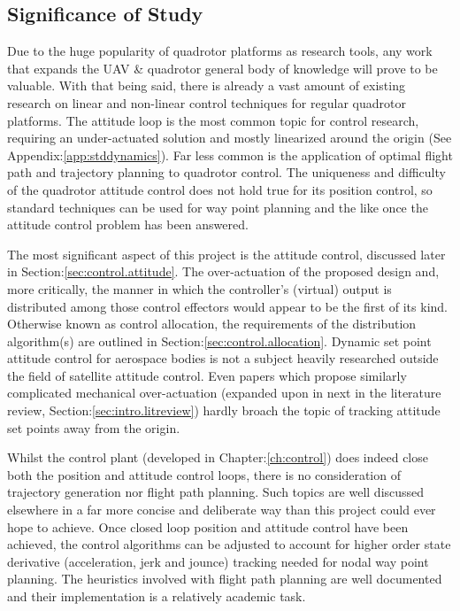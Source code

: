 \subsection{Significance of Study}
\label{subsec:intro.foreword.significance}
Due to the huge popularity of quadrotor platforms as research tools, any work that expands the UAV \& quadrotor general body of knowledge will prove to be valuable. With that being said, there is already a vast amount of existing research on linear and non-linear control techniques for regular quadrotor platforms. The attitude loop is the most common topic for control research, requiring an under-actuated solution and mostly linearized around the origin (See Appendix:\ref{app:stddynamics}). Far less common is the application of optimal flight path and trajectory planning to quadrotor control. The uniqueness and difficulty of the quadrotor attitude control does not hold true for its position control, so standard techniques can be used for way point planning and the like once the attitude control problem has been answered.
\par
The most significant aspect of this project is the attitude control, discussed later in Section:\ref{sec:control.attitude}. The over-actuation of the proposed design and, more critically, the manner in which the controller's (virtual) output is distributed among those control effectors would appear to be the first of its kind. Otherwise known as control allocation, the requirements of the distribution algorithm(s) are outlined in Section:\ref{sec:control.allocation}. Dynamic set point attitude control for aerospace bodies is not a subject heavily researched outside the field of satellite attitude control. Even papers which propose similarly complicated mechanical over-actuation (expanded upon in next in the literature review, Section:\ref{sec:intro.litreview}) hardly broach the topic of tracking attitude set points away from the origin.
\par
Whilst the control plant (developed in Chapter:\ref{ch:control}) does indeed close both the position and attitude control loops, there is no consideration of trajectory generation nor flight path planning. Such topics are well discussed elsewhere in a far more concise and deliberate way than this project could ever hope to achieve. Once closed loop position and attitude control have been achieved, the control algorithms can be adjusted to account for higher order state derivative (acceleration, jerk and jounce) tracking needed for nodal way point planning. The heuristics involved with flight path planning are well documented and their implementation is a relatively academic task.
